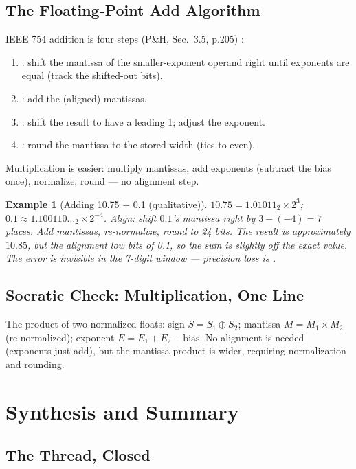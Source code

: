 \documentclass[11pt]{article}
\newtheorem{example}{Example}[section]
\begin{document}
\subsection{The Floating-Point Add Algorithm}

IEEE 754 addition is four steps (P\&H, Sec.~3.5, p.205) \cite{PattersonHennessy2017_computer_organization_design}:
\begin{enumerate}
  \item {}: shift the mantissa of the smaller-exponent operand right until exponents are equal (track the shifted-out bits).
  \item {}: add the (aligned) mantissas.
  \item {}: shift the result to have a leading 1; adjust the exponent.
  \item {}: round the mantissa to the stored width (ties to even).
\end{enumerate}

Multiplication is easier: multiply mantissas, add exponents (subtract the bias once), normalize, round --- no alignment step.

\begin{example}[Adding 10.75 + 0.1 (qualitative)]
$10.75 = 1.01011_2 \times 2^3$; $0.1 \approx 1.100110\ldots_2 \times 2^{-4}$. Align: shift $0.1$'s mantissa right by $3 - (-4) = 7$ places. Add mantissas, re-normalize, round to 24 bits. The result is approximately $10.85$, but the alignment  low bits of 0.1, so the sum is slightly off the exact value. The error is invisible in the 7-digit window --- precision loss is .
\end{example}

\subsection{Socratic Check: Multiplication, One Line}

The product of two normalized floats: sign $S = S_1 \oplus S_2$; mantissa $M = M_1 \times M_2$ (re-normalized); exponent $E = E_1 + E_2 - \text{bias}$. No alignment is needed (exponents just add), but the mantissa product is wider, requiring normalization and rounding.

\section{Synthesis and Summary}
\label{sec:synthesis}

\subsection{The Thread, Closed}
\end{document}
